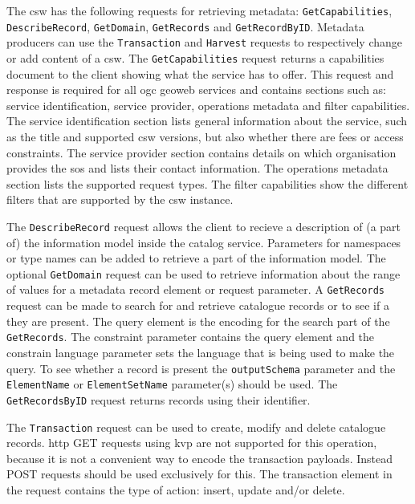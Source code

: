 \begin{sloppypar}
	The \ac{csw} has the following requests for retrieving metadata: \texttt{GetCapabilities},  \texttt{DescribeRecord}, \texttt{GetDomain}, \texttt{GetRecords} and \texttt{GetRecordByID}. Metadata producers can use the \texttt{Transaction} and \texttt{Harvest} requests to respectively change or add content of a \ac{csw}. The \texttt{GetCapabilities} request returns a capabilities document to the client showing what the service has to offer. This request and response is required for all \ac{ogc} geoweb services and contains sections such as: service identification, service provider, operations metadata and filter capabilities. The service identification section lists general information about the service, such as the title and supported \ac{csw} versions, but also whether there are fees or access constraints. The service provider section contains details on which organisation provides the \ac{sos} and lists their contact information. The operations metadata section lists the supported request types. The filter capabilities show the different filters that are supported by the \ac{csw} instance. 
\end{sloppypar}

The \texttt{DescribeRecord} request allows the client to recieve a description of (a part of) the information model inside the catalog service. Parameters for namespaces or type names can be added to retrieve a part of the information model. The optional \texttt{GetDomain} request can be used to retrieve information about the range of values for a metadata record element or request parameter. A \texttt{GetRecords} request can be made to search for and retrieve catalogue records or to see if a they are present. The query element is the encoding for the search part of the \texttt{GetRecords}. The constraint parameter contains the query element and the constrain language parameter sets the language that is being used to make the query. To see whether a record is present the \texttt{outputSchema} parameter and the \texttt{ElementName} or \texttt{ElementSetName} parameter(s) should be used. The \texttt{GetRecordsByID} request returns records using their identifier.

The \texttt{Transaction} request can be used to create, modify and delete catalogue records. \ac{http} GET requests using \ac{kvp} are not supported for this operation, because it is not a convenient way to encode the transaction payloads. Instead POST requests should be used exclusively for this. The transaction element in the request contains the type of action: insert, update and/or delete. 

